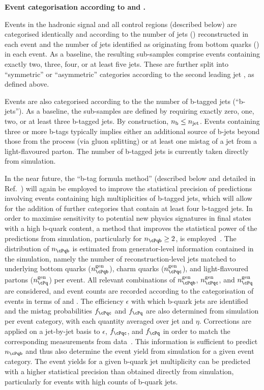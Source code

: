 {\bf Event categorisation according to \njet and \nb.} 

Events in the hadronic signal and all control regions (described
below) are categorised identically and according to the number of jets
(\njet) reconstructed in each event and the number of jets identified
as originating from bottom quarks (\nb) in each event. As a baseline,
the resulting sub-samples comprise events containing exactly two,
three, four, or at least five jets. These are further split into
``symmetric'' or ``asymmetric'' \njet categories according to the
second leading jet \Pt, as defined above.

Events are also categorised according to the the number of b-tagged
jets (``b-jets''). As a baseline, the sub-samples are defined by
requiring exactly zero, one, two, or at least three b-tagged jets. By
construction, $n_{\text{b}} \leq n_{\text{jet}}$. Events containing three or more b-tags
typically implies either an additional source of b-jets beyond those
from the \ttbar process (\eg via gluon splitting) or at least one
mistag of a jet from a light-flavoured parton. The number of b-tagged
jets is currently taken directly from simulation.

In the near future, the ``b-tag formula method'' (described below and
detailed in Ref.~\cite{Chatrchyan:2013lya}) will again be employed to
improve the statistical precision of predictions involving events
containing high multiplicities of b-tagged jets, which will allow for
the addition of further categories that contain at least four b-tagged
jets. In order to maximise sensitivity to potential new physics
signatures in final states with a high b-quark content, a method that
improves the statistical power of the predictions from simulation,
particularly for $n_\cPqb \ge 2$, is employed~\cite{RA1Paper2012}. The
distribution of $n_\cPqb$ is estimated from generator-level
information contained in the simulation, namely the number of
reconstruction-level jets matched to underlying bottom quarks
($n_\cPqb^\text{gen}$), charm quarks ($n_\cPqc^\text{gen}$), and
light-flavoured partons ($n_\cPq^\text{gen}$) per event. All relevant
combinations of $n_\cPqb^{\rm gen}$, $n_\cPqc^{\rm gen}$, and
$n_{\cPq}^{\rm gen}$ are considered, and event counts are recorded
according to the categorisation of events in terms of \njet and
\scalht. The efficiency $\epsilon$ with which b-quark jets are
identified and the mistag probabilities $f_\cPqc$ and $f_\cPq$ are
also determined from simulation per event category, with each quantity
averaged over jet \pt and $\eta$. Corrections are applied on a
jet-by-jet basis to $\epsilon$, $f_\cPqc$, and $f_\cPq$ in order to
match the corresponding measurements from
data~\cite{CMS-PAS-BTV-12-001}. This information is sufficient to
predict $n_\cPqb$ and thus also determine the event yield from
simulation for a given event category. The event yields for a given
b-quark jet multiplicity can be predicted with a higher statistical
precision than obtained directly from simulation, particularly for
events with high counts of b-quark jets.

